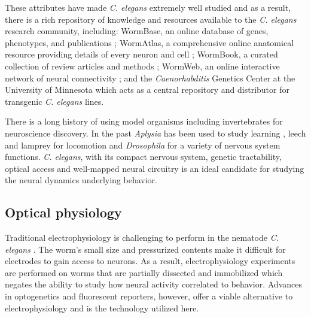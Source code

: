 These attributes have made  \textit{C. elegans}  extremely well studied and as a result, there is a rich repository of knowledge and resources available to the \textit{C. elegans} research community, including:  WormBase, an online database of genes, phenotypes, and publications \citep{harris_wormbase:_2010}; WormAtlas, a comprehensive online anatomical resource providing details of every neuron and cell \citep{altun_wormatlas_2002}; WormBook, a curated collection of review articles and methods \citep{the_c._elegans_research_community_wormbook_2011}; WormWeb, an online interactive network of neural connectivity \citep{bhatla_c._2009};  and the \textit{Caenorhabditis} Genetics Center at the University of Minnesota which acts as a central repository and distributor for transgenic \textit{C. elegans} lines.


There is a long history of using model organisms including invertebrates for neuroscience discovery. In the past \textit{Aplysia} has been used to study learning \citep{castellucci_neuronal_1970}, leech and lamprey for locomotion \citep{briggman_imaging_2006} and \textit{Drosophila} \citep{zhang_drosophila_2010} for a variety of nervous system functions. \textit{C. elegans}, with its compact nervous system, genetic tractability,  optical access and well-mapped neural circuitry is an ideal candidate for studying the neural dynamics underlying behavior.




\subsection{Optical physiology}
Traditional electrophysiology is challenging to perform in the nematode \textit{C. elegans} \citep{goodman_active_1998, schafer_neurophysiological_2006}. The worm's small size and pressurized contents make it difficult for electrodes to gain access to neurons.  As a result, electrophysiology experiments are  performed on worms that are partially dissected and immobilized which negates the ability to study how neural activity correlated to behavior. Advances in optogenetics and fluorescent reporters, however,  offer a viable alternative to electrophysiology and is the technology utilized here.

